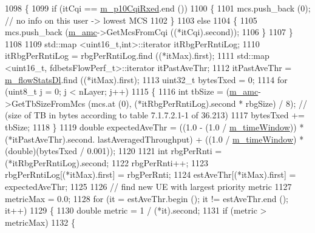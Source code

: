 \begin{DoxyCode}
1098                 \{
1099                   \textcolor{keywordflow}{if} (itCqi == \hyperlink{classns3_1_1FdBetFfMacScheduler_a122fbac27516524b54245db095d9162c}{m\_p10CqiRxed}.end ())
1100                     \{
1101                       mcs.push\_back (0); \textcolor{comment}{// no info on this user -> lowest MCS}
1102                     \}
1103                   \textcolor{keywordflow}{else}
1104                     \{
1105                       mcs.push\_back (\hyperlink{classns3_1_1FdBetFfMacScheduler_ab6734e88a03f8d5085607802a0b49bbb}{m\_amc}->GetMcsFromCqi ((*itCqi).second));
1106                     \}
1107                 \}
1108 
1109               std::map <uint16\_t,int>::iterator itRbgPerRntiLog;
1110               itRbgPerRntiLog = rbgPerRntiLog.find ((*itMax).first);
1111               std::map <uint16\_t, fdbetsFlowPerf\_t>::iterator itPastAveThr;
1112               itPastAveThr = \hyperlink{classns3_1_1FdBetFfMacScheduler_a347c3f4c314a6791eef27d768927392a}{m\_flowStatsDl}.find ((*itMax).first);
1113               uint32\_t bytesTxed = 0;
1114               \textcolor{keywordflow}{for} (uint8\_t j = 0; j < nLayer; j++)
1115                 \{
1116                   \textcolor{keywordtype}{int} tbSize = (\hyperlink{classns3_1_1FdBetFfMacScheduler_ab6734e88a03f8d5085607802a0b49bbb}{m\_amc}->GetTbSizeFromMcs (mcs.at (0), (*itRbgPerRntiLog).second * 
      rbgSize) / 8); \textcolor{comment}{// (size of TB in bytes according to table 7.1.7.2.1-1 of 36.213)}
1117                   bytesTxed += tbSize;
1118                 \}
1119               \textcolor{keywordtype}{double} expectedAveThr = ((1.0 - (1.0 / \hyperlink{classns3_1_1FdBetFfMacScheduler_acc6dde5313aae9a6a40d72e7c883689c}{m\_timeWindow})) * (*itPastAveThr).second.
      lastAveragedThroughput) + ((1.0 / \hyperlink{classns3_1_1FdBetFfMacScheduler_acc6dde5313aae9a6a40d72e7c883689c}{m\_timeWindow}) * (double)(bytesTxed / 0.001));
1120 
1121               \textcolor{keywordtype}{int} rbgPerRnti = (*itRbgPerRntiLog).second;
1122               rbgPerRnti++;
1123               rbgPerRntiLog[(*itMax).first] = rbgPerRnti;
1124               estAveThr[(*itMax).first] = expectedAveThr;
1125 
1126               \textcolor{comment}{// find new UE with largest priority metric}
1127               metricMax = 0.0;
1128               \textcolor{keywordflow}{for} (it = estAveThr.begin (); it != estAveThr.end (); it++)
1129                 \{
1130                   \textcolor{keywordtype}{double} metric = 1 / (*it).second;
1131                   \textcolor{keywordflow}{if} (metric > metricMax)
1132                     \{

\end{DoxyCode}
